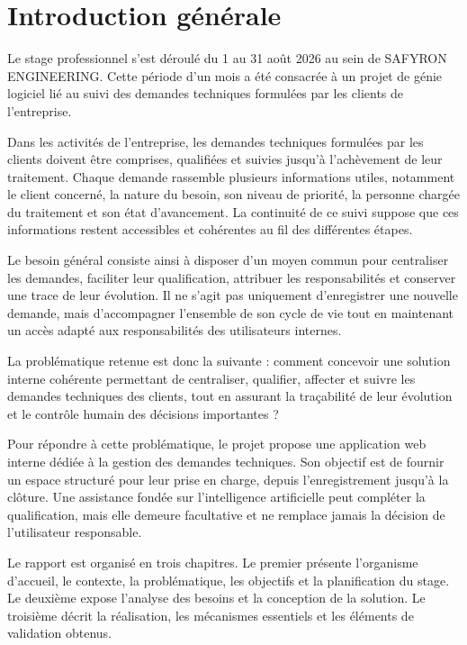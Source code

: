 \chapter*{Introduction générale}
\label{chap:00-introduction}

Le stage professionnel s'est déroulé du 1\ier{} au 31 août 2026 au sein de SAFYRON ENGINEERING. Cette période d'un mois a été consacrée à un projet de génie logiciel lié au suivi des demandes techniques formulées par les clients de l'entreprise.

Dans les activités de l'entreprise, les demandes techniques formulées par les clients doivent être comprises, qualifiées et suivies jusqu'à l'achèvement de leur traitement. Chaque demande rassemble plusieurs informations utiles, notamment le client concerné, la nature du besoin, son niveau de priorité, la personne chargée du traitement et son état d'avancement. La continuité de ce suivi suppose que ces informations restent accessibles et cohérentes au fil des différentes étapes.

Le besoin général consiste ainsi à disposer d'un moyen commun pour centraliser les demandes, faciliter leur qualification, attribuer les responsabilités et conserver une trace de leur évolution. Il ne s'agit pas uniquement d'enregistrer une nouvelle demande, mais d'accompagner l'ensemble de son cycle de vie tout en maintenant un accès adapté aux responsabilités des utilisateurs internes.

La problématique retenue est donc la suivante : comment concevoir une solution interne cohérente permettant de centraliser, qualifier, affecter et suivre les demandes techniques des clients, tout en assurant la traçabilité de leur évolution et le contrôle humain des décisions importantes ?

Pour répondre à cette problématique, le projet propose une application web interne dédiée à la gestion des demandes techniques. Son objectif est de fournir un espace structuré pour leur prise en charge, depuis l'enregistrement jusqu'à la clôture. Une assistance fondée sur l'intelligence artificielle peut compléter la qualification, mais elle demeure facultative et ne remplace jamais la décision de l'utilisateur responsable.

Le rapport est organisé en trois chapitres. Le premier présente l'organisme d'accueil, le contexte, la problématique, les objectifs et la planification du stage. Le deuxième expose l'analyse des besoins et la conception de la solution. Le troisième décrit la réalisation, les mécanismes essentiels et les éléments de validation obtenus.
